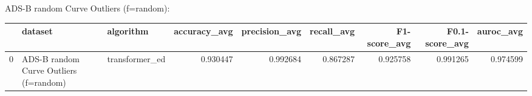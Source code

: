 ADS-B random Curve Outliers (f=random):

\begin{tabular}{rllrrrrrr}
\hline
    & dataset                                & algorithm      &   accuracy\_avg &   precision\_avg &   recall\_avg &   F1-score\_avg &   F0.1-score\_avg &   auroc\_avg \\
\hline
  0 & ADS-B random Curve Outliers (f=random) & transformer\_ed &       0.930447 &        0.992684 &     0.867287 &       0.925758 &         0.991265 &    0.974599 \\
\hline
\end{tabular}

